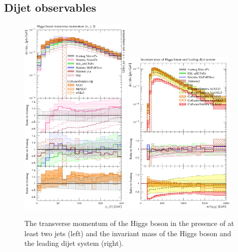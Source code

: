 \subsection{Dijet observables}
\label{sec:hjetscomp:results:2jobs}

\begin{figure}[t!]
  \centering
  \includegraphics[width=0.47\textwidth]{figures/hjetscomp_H_jj_pT_incl.pdf}
  \quad
  \includegraphics[width=0.47\textwidth]{figures/hjetscomp_H_dijet_mass.pdf}
  \caption{
    The transverse momentum of the Higgs boson in the 
    presence of at least two jets (left) and the invariant mass of the 
    Higgs boson and the leading dijet system (right).
    \label{fig:higgscomp:results:1obs:hjpt}
  }
\end{figure}

